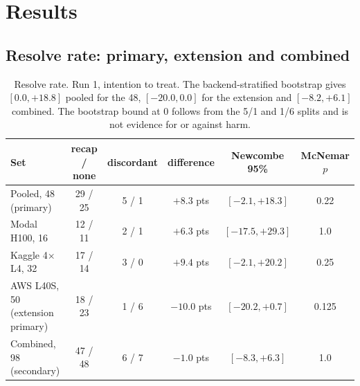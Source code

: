 \documentclass[11pt]{article}
\begin{document}
\begin{table}[t]\centering\small
\caption{Noise floor with no treatment (no memory, run 2 vs run 1).}\label{tab:aa}
\end{table}

\section{Results}
\subsection{Resolve rate: primary, extension and combined}\label{sec:primary}

\begin{table}[t]\centering\small
\caption{Resolve rate. Run 1, intention to treat. The backend-stratified bootstrap gives
$[0.0, +18.8]$ pooled for the 48, $[-20.0, 0.0]$ for the extension and $[-8.2, +6.1]$ combined. The
bootstrap bound at 0 follows from the 5/1 and 1/6 splits and is not evidence for or against harm.}\label{tab:primary}
\begin{tabular}{lccccc}\toprule
Set & recap / none & discordant & difference & Newcombe 95\% & McNemar $p$ \\\midrule
Pooled, 48 (primary) & 29 / 25 & 5 / 1 & $+8.3$ pts & $[-2.1, +18.3]$ & 0.22 \\
Modal H100, 16 & 12 / 11 & 2 / 1 & $+6.3$ pts & $[-17.5, +29.3]$ & 1.0 \\
Kaggle 4$\times$L4, 32 & 17 / 14 & 3 / 0 & $+9.4$ pts & $[-2.1, +20.2]$ & 0.25 \\
AWS L40S, 50 (extension primary) & 18 / 23 & 1 / 6 & $-10.0$ pts & $[-20.2, +0.7]$ & 0.125 \\
Combined, 98 (secondary) & 47 / 48 & 6 / 7 & $-1.0$ pts & $[-8.3, +6.3]$ & 1.0 \\\bottomrule
\end{tabular}
\end{table}
\end{document}
